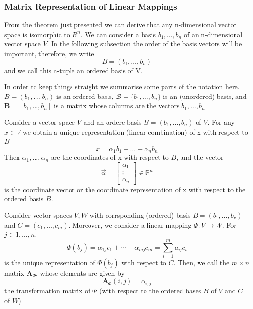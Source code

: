 \subsubsection*{Matrix Representation of Linear Mappings}
From the theorem just presented we can derive that any n-dimensional vector space is isomorphic to $R^n$. We can consider a basis ${b_1,\ldots,b_n}$ of an n-dimensional vector space $V$. In the following subsection the order of the basis vectors will be important, therefore, we write
\[
    B = (b_1,\ldots,b_n)
\]
and we call this n-tuple an ordered basis of V.
\begin{remark}[Notation]
    In order to keep things straight we summarise some parts of the notation here. $B = (b_1,\ldots,b_n)$ is an ordered basis, $\mathcal{B} = \{b_1,\ldots,b_n\}$ is an (unordered) basis, and $\mathbf{B} = [b_1,\ldots,b_n]$ is a matrix whose columns are the vectors $b_1,\ldots, b_n$
\end{remark}
\begin{definition}[Coordinates]
    Consider a vector space $V$ and an ordere basis $B = (b_1,\ldots,b_n)$ of $V$. For any $x \in V$ we obtain a unique representation (linear combination) of x with respect to $B$
    \[
        x = \alpha_1b_1+\ldots+\alpha_nb_n  
    \]
    Then $\alpha_1,\ldots,\alpha_n$ are the coordinates of x with respect to $B$, and the vector
    \[
        \vec{\alpha} =
        \begin{bmatrix}
            \alpha_1\\
            \vdots\\
            \alpha_n
        \end{bmatrix} \in \mathbb{R}^n
    \]
    is the coordinate vector or the coordinate representation of x with respect to the ordered basis $B$.
\end{definition}
\begin{definition}
    Consider vector spaces $V,W$ with corrsponding (ordered) basis $B = (b_1,\ldots,b_n)$ and $C = (c_1,\ldots,c_m)$. Moreover, we consider a linear mapping $\Phi : V \longrightarrow W$. For $j \in {1,\ldots,n}$,
    \[
        \Phi(b_j) = \alpha_{1j}c_1+ \cdots + \alpha_{mj}c_m = \sum_{i=1}^{m}{a_{ij}c_i}  
    \]
    is the unique representation of $\Phi(b_j)$ with respect to $C$. Then, we call the $m\times n$ matrix $\mathbf{A}_{\Phi}$, whose elements are given by
        \[
            \mathbf{A}_{\Phi}(i,j) = \alpha_{i,j}
        \]
    the transformation matrix of $\Phi$ (with respect to the ordered bases $B$ of $V$ and $C$ of $W$)
\end{definition}
